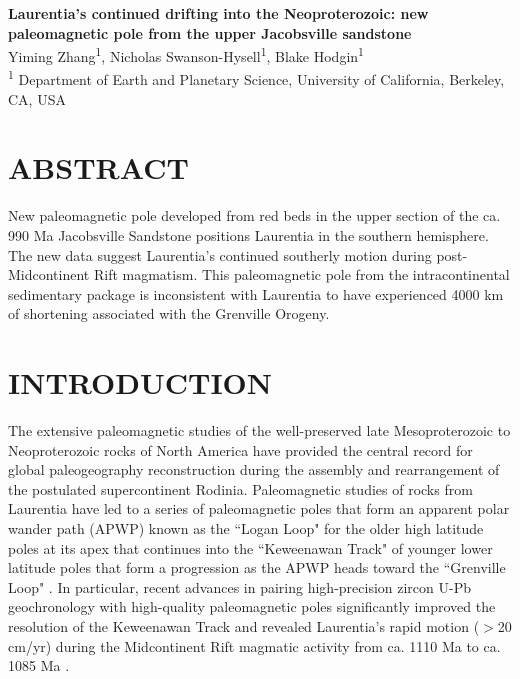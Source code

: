 \documentclass[11pt,letterpaper]{article}
\begin{document}
\begin{flushleft}

{\Large \textbf{Laurentia's continued drifting into the Neoproterozoic: new paleomagnetic pole from the upper Jacobsville sandstone}}
\\
\singlespacing
 Yiming Zhang\textsuperscript{1}, Nicholas Swanson-Hysell\textsuperscript{1}, Blake Hodgin\textsuperscript{1}\\
\bigskip
\textsuperscript{1} Department of Earth and Planetary Science, University of California, Berkeley, CA, USA\\

\smallskip
\end{flushleft}


\section*{ABSTRACT}
New paleomagnetic pole developed from red beds in the upper section of the ca. 990 Ma Jacobsville Sandstone positions Laurentia in the southern hemisphere. The new data suggest Laurentia's continued southerly motion during post-Midcontinent Rift magmatism. This paleomagnetic pole from the intracontinental sedimentary package is inconsistent with Laurentia to have experienced 4000 km of shortening associated with the Grenville Orogeny. 

\section*{INTRODUCTION}

The extensive paleomagnetic studies of the well-preserved late Mesoproterozoic to Neoproterozoic rocks of North America have provided the central record for global paleogeography reconstruction during the assembly and rearrangement of the postulated supercontinent Rodinia. Paleomagnetic studies of rocks from Laurentia have led to a series of paleomagnetic poles that form an apparent polar wander path (APWP) known as the ``Logan Loop" for the older high latitude poles at its apex that continues into the ``Keweenawan Track" of younger lower latitude poles that form a progression as the APWP heads toward the ``Grenville Loop" \citep{Swanson-Hysell2019a}. In particular, recent advances in pairing high-precision zircon U-Pb geochronology with high-quality paleomagnetic poles significantly improved the resolution of the Keweenawan Track and revealed Laurentia's rapid motion ($>$20 cm/yr) during the Midcontinent Rift magmatic activity from ca. 1110 Ma to ca. 1085 Ma \citep{Swanson-Hysell2019a}. 
\end{document}
